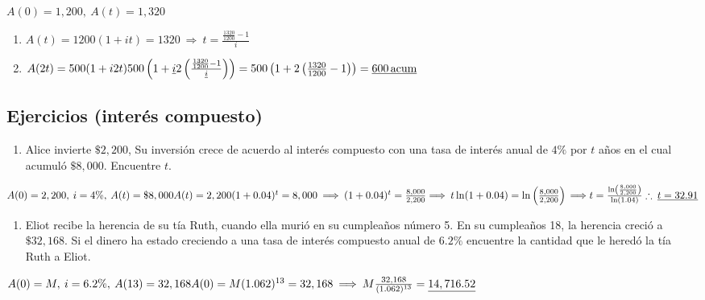 \documentclass[
]{book}
\providecommand{\tightlist}{%
  \setlength{\itemsep}{0pt}\setlength{\parskip}{0pt}}
\theoremstyle{definition}
\theoremstyle{definition}
\theoremstyle{definition}
\theoremstyle{definition}
\theoremstyle{remark}
\begin{document}
\(A(0) = 1,200, \: A(t) = 1,320\)

\begin{enumerate}
\def\labelenumi{\alph{enumi})}
\item
  \(A(t) = 1200(1+it) = 1320 \: \Longrightarrow \: t = \frac{\frac{1320}{1200}-1}{i}\)
\item
  \(A(2t) = 500(1+i2t)\\ 500\left( 1+\underline{i}2\left( \frac{\frac{1320}{1200}-1}{\underline{i}}\right) \right) = 500 \left( 1 + 2 \left( \frac{1320}{1200} -1\right) \right) = \underline{600\, \text{acum}}\)
\end{enumerate}

\hypertarget{ejercicios-interuxe9s-compuesto}{%
\subsection{Ejercicios (interés compuesto)}\label{ejercicios-interuxe9s-compuesto}}

\begin{enumerate}
\def\labelenumi{\arabic{enumi}.}
\tightlist
\item
  Alice invierte \(\$2,200\), Su inversión crece de acuerdo al interés compuesto con una tasa de interés anual de \(4\%\) por \(t\) años en el cual acumuló \(\$8,000\). Encuentre \(t\).
\end{enumerate}

\(A(0) = 2,200,\: i=4\%,\: A(t) = \$ 8,000 \\ A(t) = 2,200(1+0.04)^t = 8,000 \: \Longrightarrow \: (1+0.04)^t = \frac{8,000}{2,200} \\ \Longrightarrow \: t\ln(1+0.04) = \ln\left( \frac{8,000}{2,200}\right) \\ \Longrightarrow t =\frac{\ln\left(\frac{8,000}{2,200} \right) }{\ln(1.04)} \\ \therefore \: \underline{t=32.91}\)

\begin{enumerate}
\def\labelenumi{\arabic{enumi}.}
\setcounter{enumi}{1}
\tightlist
\item
  Eliot recibe la herencia de su tía Ruth, cuando ella murió en su cumpleaños número 5. En su cumpleaños 18, la herencia creció a \(\$ 32,168\). Si el dinero ha estado creciendo a una tasa de interés compuesto anual de \(6.2\%\) encuentre la cantidad que le heredó la tía Ruth a Eliot.
\end{enumerate}

\(A(0) = M,\: i = 6.2\%,\: A(13) = 32,168\\ A(0) = M(1.062)^{13} = 32,168 \: \Longrightarrow \: M\frac{32,168}{(1.062)^{13}} = \underline{14,716.52}\)
\end{document}
